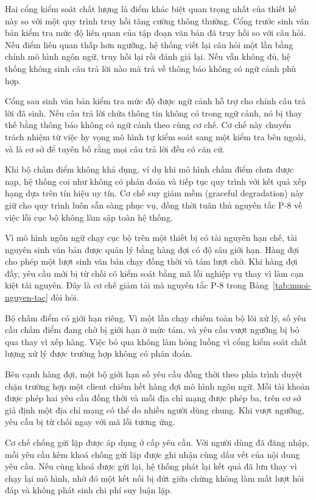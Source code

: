 Hai cổng kiểm soát chất lượng là điểm khác biệt quan trọng nhất của thiết kế này so với một quy trình truy hồi tăng cường thông thường. Cổng trước sinh văn bản kiểm tra mức độ liên quan của tập đoạn văn bản đã truy hồi so với câu hỏi. Nếu điểm liên quan thấp hơn ngưỡng, hệ thống viết lại câu hỏi một lần bằng chính mô hình ngôn ngữ, truy hồi lại rồi đánh giá lại. Nếu vẫn không đủ, hệ thống không sinh câu trả lời nào mà trả về thông báo không có ngữ cảnh phù hợp.

Cổng sau sinh văn bản kiểm tra mức độ được ngữ cảnh hỗ trợ cho chính câu trả lời đã sinh. Nếu câu trả lời chứa thông tin không có trong ngữ cảnh, nó bị thay thế bằng thông báo không có ngữ cảnh theo cùng cơ chế. Cơ chế này chuyển trách nhiệm từ việc hy vọng mô hình tự kiểm soát sang một kiểm tra bên ngoài, và là cơ sở để tuyên bố rằng mọi câu trả lời đều có căn cứ.

Khi bộ chấm điểm không khả dụng, ví dụ khi mô hình chấm điểm chưa được nạp, hệ thống coi như không có phán đoán và tiếp tục quy trình với kết quả xếp hạng dựa trên tín hiệu uy tín. Cơ chế suy giảm mềm (graceful degradation) này giữ cho quy trình luôn sẵn sàng phục vụ, đồng thời tuân thủ nguyên tắc P-8 về việc lỗi cục bộ không làm sập toàn hệ thống.

Vì mô hình ngôn ngữ chạy cục bộ trên một thiết bị có tài nguyên hạn chế, tài nguyên sinh văn bản được quản lý bằng hàng đợi có độ sâu giới hạn. Hàng đợi cho phép một lượt sinh văn bản chạy đồng thời và tám lượt chờ. Khi hàng đợi đầy, yêu cầu mới bị từ chối có kiểm soát bằng mã lỗi nghiệp vụ thay vì làm cạn kiệt tài nguyên. Đây là cơ chế giảm tải mà nguyên tắc P-8 trong Bảng~\ref{tab:muoi-nguyen-tac} đòi hỏi.

Bộ chấm điểm có giới hạn riêng. Vì một lần chạy chiếm toàn bộ lõi xử lý, số yêu cầu chấm điểm đang chờ bị giới hạn ở mức tám, và yêu cầu vượt ngưỡng bị bỏ qua thay vì xếp hàng. Việc bỏ qua không làm hỏng luồng vì cổng kiểm soát chất lượng xử lý được trường hợp không có phán đoán.

Bên cạnh hàng đợi, một bộ giới hạn số yêu cầu đồng thời theo phía trình duyệt chặn trường hợp một client chiếm hết hàng đợi mô hình ngôn ngữ. Mỗi tài khoản được phép hai yêu cầu đồng thời và mỗi địa chỉ mạng được phép ba, trên cơ sở giả định một địa chỉ mạng có thể do nhiều người dùng chung. Khi vượt ngưỡng, yêu cầu bị từ chối ngay với mã lỗi tương ứng.

Cơ chế chống gửi lặp được áp dụng ở cấp yêu cầu. Với người dùng đã đăng nhập, mỗi yêu cầu kèm khoá chống gửi lặp được ghi nhận cùng dấu vết của nội dung yêu cầu. Nếu cùng khoá được gửi lại, hệ thống phát lại kết quả đã lưu thay vì chạy lại mô hình, nhờ đó một kết nối bị đứt giữa chừng không làm mất lượt hỏi đáp và không phát sinh chi phí suy luận lặp.

